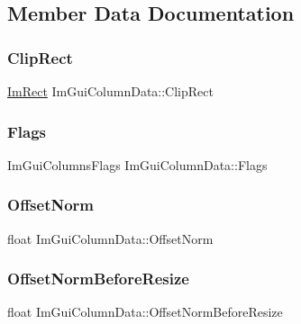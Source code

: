 \subsection{Member Data Documentation}
\hypertarget{struct_im_gui_column_data_aeccf8bbbd380fdd9d3350b5aac95ad34}{}\label{struct_im_gui_column_data_aeccf8bbbd380fdd9d3350b5aac95ad34} 
\subsubsection{\texorpdfstring{Clip\+Rect}{ClipRect}}
{\footnotesize\ttfamily \hyperlink{struct_im_rect}{Im\+Rect} Im\+Gui\+Column\+Data\+::\+Clip\+Rect}

\hypertarget{struct_im_gui_column_data_ab683ea097b8c60f143dc3c31818fa8d8}{}\label{struct_im_gui_column_data_ab683ea097b8c60f143dc3c31818fa8d8} 
\subsubsection{\texorpdfstring{Flags}{Flags}}
{\footnotesize\ttfamily Im\+Gui\+Columns\+Flags Im\+Gui\+Column\+Data\+::\+Flags}

\hypertarget{struct_im_gui_column_data_a9678a00f55c9fa44ed35ec14ea9b697b}{}\label{struct_im_gui_column_data_a9678a00f55c9fa44ed35ec14ea9b697b} 
\subsubsection{\texorpdfstring{Offset\+Norm}{OffsetNorm}}
{\footnotesize\ttfamily float Im\+Gui\+Column\+Data\+::\+Offset\+Norm}

\hypertarget{struct_im_gui_column_data_aa97d00380db4a4b11ebc1f1f8ef72fc8}{}\label{struct_im_gui_column_data_aa97d00380db4a4b11ebc1f1f8ef72fc8} 
\subsubsection{\texorpdfstring{Offset\+Norm\+Before\+Resize}{OffsetNormBeforeResize}}
{\footnotesize\ttfamily float Im\+Gui\+Column\+Data\+::\+Offset\+Norm\+Before\+Resize}

